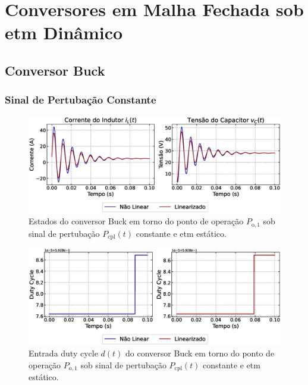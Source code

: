 \section{Conversores em Malha Fechada sob \acrshort{etm} Dinâmico}

\subsection{Conversor Buck}

\subsubsection{Sinal de Pertubação Constante}


\begin{figure}[H]
  \centering
  \captionsetup{justification=centering}
  \includegraphics[width=1.\textwidth]{figuras/dynamic-etm/buck/sim1/op1/result.eps}
  \caption{Estados do conversor Buck em torno do ponto de operação $P_{\mathrm{o}, 1}$ sob sinal de pertubação $P_{\mathrm{cpl}}(t)$ constante e \acrshort{etm} estático.}
\end{figure}

\begin{figure}[H]
  \centering
  \captionsetup{justification=centering}
  \includegraphics[width=1.\textwidth]{figuras/dynamic-etm/buck/sim1/op1/duty-cycle.eps}
  \caption{Entrada duty cycle $d(t)$ do conversor Buck em torno do ponto de operação $P_{\mathrm{o}, 1}$ sob sinal de pertubação $P_{\mathrm{cpl}}(t)$ constante e \acrshort{etm} estático.}
\end{figure}

